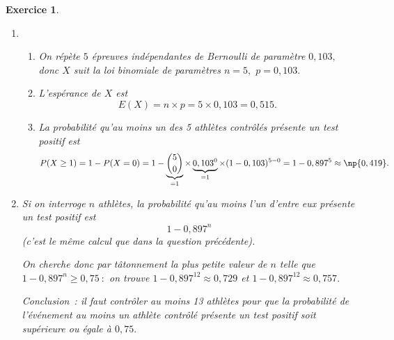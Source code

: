\documentclass[10pt]{article}
\newtheorem{exo}{Exercice}
\begin{document}
\begin{exo}



\begin{enumerate}
\item 	\begin{enumerate}
		\item On répète $5$ épreuves indépendantes de Bernoulli de paramètre $0,103,$ donc $X$ suit la loi binomiale de paramètres $n=5, $ $p=0,103.$
		\item L'espérance de $X$ est \[E(X)=n\times p=5\times 0,103=0,515.\] 
		
		\item La probabilité qu'au moins un des 5 athlètes contrôlés présente un test positif est 
		\[P(X\geq 1)=1-P(X=0)=1-\underbrace{\binom{5}{0}}_{=1}\times \underbrace{0,103^{0}}_{=1}\times (1-0,103)^{5-0}=1- 0,897^{5}\approx \np{0,419}.\]
	\end{enumerate}
\item Si on interroge $n$ athlètes, la probabilité qu'au moins l'un  d'entre eux présente un test positif est \[1-0,897^n\] (c'est le même calcul que dans la question précédente).

\medskip

On cherche donc par tâtonnement la plus petite valeur de $n$ telle que $1-0,897^n\geq 0,75~:$ on trouve $1-0,897^{12}\approx 0,729$ et $1-0,897^{12}\approx 0,757.$

\medskip

Conclusion~: il faut contrôler au moins 13 athlètes pour que la probabilité de l'événement \og au moins un athlète contrôlé présente un test positif \fg{} soit supérieure ou égale à $0,75.$
\end{enumerate}

\end{exo}
\end{document}
